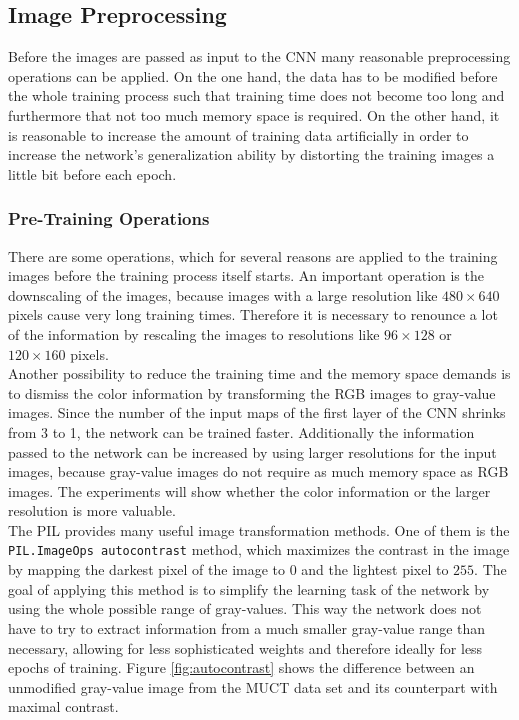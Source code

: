 \documentclass[11pt, a4paper]{article}
\begin{document}
\subsection{Image Preprocessing}
\label{subsec:image_preprocessing}

Before the images are passed as input to the \ac{CNN} many reasonable preprocessing operations can be applied. On the one hand, the data has to be modified before the whole training process such that training time does not become too long and furthermore that not too much memory space is required. On the other hand, it is reasonable to increase the amount of training data artificially in order to increase the network's generalization ability by distorting the training images a little bit before each epoch.

\subsubsection{Pre-Training Operations}

There are some operations, which for several reasons are applied to the training images before the training process itself starts. An important operation is the downscaling of the images, because images with a large resolution like $480\times 640$ pixels cause very long training times. Therefore it is necessary to renounce a lot of the information by rescaling the images to resolutions like $96\times 128$ or $120\times 160$ pixels.\\
Another possibility to reduce the training time and the memory space demands is to dismiss the color information by transforming the \ac{RGB} images to gray-value images. Since the number of the input maps of the first layer of the \ac{CNN} shrinks from 3 to 1, the network can be trained faster. Additionally the information passed to the network can be increased by using larger resolutions for the input images, because gray-value images do not require as much memory space as \ac{RGB} images. The experiments will show whether the color information or the larger resolution is more valuable.\\
The \ac{PIL} provides many useful image transformation methods. One of them is the \texttt{PIL.ImageOps autocontrast} method, which maximizes the contrast in the image by mapping the darkest pixel of the image to $0$ and the lightest pixel to $255$. The goal of applying this method is to simplify the learning task of the network by using the whole possible range of gray-values. This way the network does not have to try to extract information from a much smaller gray-value range than necessary, allowing for less sophisticated weights and therefore ideally for less epochs of training. Figure \ref{fig:autocontrast} shows the difference between an unmodified gray-value image from the \ac{MUCT} data set and its counterpart with maximal contrast.
\end{document}

